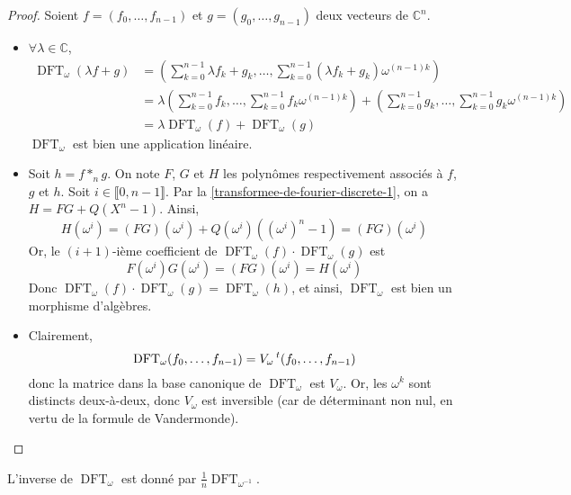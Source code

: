	\begin{proof}
		Soient $f = (f_0, \dots, f_{n-1})$ et $g = (g_0, \dots, g_{n-1})$ deux vecteurs de $\mathbb{C}^n$.
		\begin{itemize}
			\item $\forall \lambda \in \mathbb{C}$,
			\begin{align*}
				\operatorname{DFT}_\omega(\lambda f + g) &= \left(\sum_{k=0}^{n-1} \lambda f_k + g_k, \dots, \sum_{k=0}^{n-1} (\lambda f_k + g_k) \omega^{(n-1)k} \right) \\
				&= \lambda \left(\sum_{k=0}^{n-1} f_k, \dots, \sum_{k=0}^{n-1} f_k \omega^{(n-1)k} \right) + \left(\sum_{k=0}^{n-1} g_k, \dots, \sum_{k=0}^{n-1} g_k \omega^{(n-1)k} \right) \\
				&= \lambda \operatorname{DFT}_\omega(f) + \operatorname{DFT}_\omega(g)
			\end{align*}
			$\operatorname{DFT}_\omega$ est bien une application linéaire.
			\item Soit $h = f *_n g$. On note $F$, $G$ et $H$ les polynômes respectivement associés à $f$, $g$ et $h$.
			\newpar
			Soit $i \in \llbracket 0, n-1 \rrbracket$. Par la \cref{transformee-de-fourier-discrete-1}, on a $H = FG + Q(X^n - 1)$. Ainsi,
			\[ H(\omega^i) = (FG)(\omega^i) + Q(\omega^i)((\omega^i)^n - 1) = (FG)(\omega^i) \]
			Or, le $(i + 1)$-ième coefficient de $\operatorname{DFT}_\omega(f) \cdot \operatorname{DFT}_\omega(g)$ est
			\[ F(\omega^i) G(\omega^i) = (FG)(\omega^i) = H(\omega^i) \]
			Donc $\operatorname{DFT}_\omega(f) \cdot \operatorname{DFT}_\omega(g) = \operatorname{DFT}_\omega(h)$, et ainsi, $\operatorname{DFT}_\omega$ est bien un morphisme d'algèbres.
			\item Clairement,
			\[ \operatorname{DFT}_\omega(f_0, \dots, f_{n-1}) = V_\omega \, \mathstrut ^t (f_0, \dots, f_{n-1}) \]
			donc la matrice dans la base canonique de $\operatorname{DFT}_\omega$ est $V_\omega$. Or, les $\omega^k$ sont distincts deux-à-deux, donc $V_\omega$ est inversible (car de déterminant non nul, en vertu de la formule de Vandermonde).
		\end{itemize}
	\end{proof}
	
	\begin{proposition}
		\label{transformee-de-fourier-discrete-3}
		L'inverse de $\operatorname{DFT}_\omega$ est donné par $\frac{1}{n} \operatorname{DFT}_{\omega^{-1}}$.
	\end{proposition}
	
